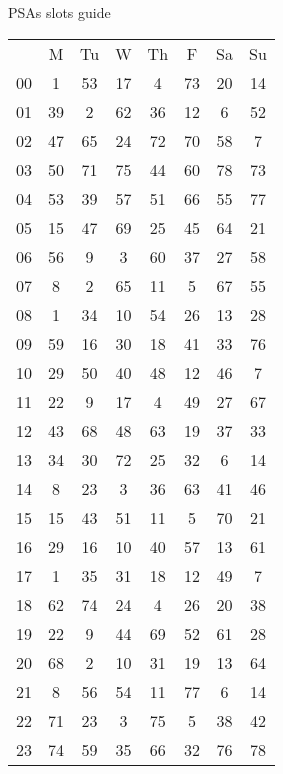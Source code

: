 \documentclass{article}
\begin{document}

\clearpage
\begin{center}
\Large PSAs slots guide
\end{center}

\begin{center}
\begin{tabular}{c|c|c|c|c|c|c|c|}
  \multicolumn{1}{c}{} & 
  \multicolumn{1}{c}{M} & 
  \multicolumn{1}{c}{Tu} & 
  \multicolumn{1}{c}{W} & 
  \multicolumn{1}{c}{Th} & 
  \multicolumn{1}{c}{F} & 
  \multicolumn{1}{c}{Sa} & 
  \multicolumn{1}{c}{Su} \\ \cline{2-8}
  00 & 1 & 53 & 17 & 4 & 73 & 20 & 14 \\ \cline{2-8}
  01 & 39 & 2 & 62 & 36 & 12 & 6 & 52 \\ \cline{2-8}
  02 & 47 & 65 & 24 & 72 & 70 & 58 & 7 \\ \cline{2-8}
  03 & 50 & 71 & 75 & 44 & 60 & 78 & 73 \\ \cline{2-8}
  04 & 53 & 39 & 57 & 51 & 66 & 55 & 77 \\ \cline{2-8}
  05 & 15 & 47 & 69 & 25 & 45 & 64 & 21 \\ \cline{2-8}
  06 & 56 & 9 & 3 & 60 & 37 & 27 & 58 \\ \cline{2-8}
  07 & 8 & 2 & 65 & 11 & 5 & 67 & 55 \\ \cline{2-8}
  08 & 1 & 34 & 10 & 54 & 26 & 13 & 28 \\ \cline{2-8}
  09 & 59 & 16 & 30 & 18 & 41 & 33 & 76 \\ \cline{2-8}
  10 & 29 & 50 & 40 & 48 & 12 & 46 & 7 \\ \cline{2-8}
  11 & 22 & 9 & 17 & 4 & 49 & 27 & 67 \\ \cline{2-8}
  12 & 43 & 68 & 48 & 63 & 19 & 37 & 33 \\ \cline{2-8}
  13 & 34 & 30 & 72 & 25 & 32 & 6 & 14 \\ \cline{2-8}
  14 & 8 & 23 & 3 & 36 & 63 & 41 & 46 \\ \cline{2-8}
  15 & 15 & 43 & 51 & 11 & 5 & 70 & 21 \\ \cline{2-8}
  16 & 29 & 16 & 10 & 40 & 57 & 13 & 61 \\ \cline{2-8}
  17 & 1 & 35 & 31 & 18 & 12 & 49 & 7 \\ \cline{2-8}
  18 & 62 & 74 & 24 & 4 & 26 & 20 & 38 \\ \cline{2-8}
  19 & 22 & 9 & 44 & 69 & 52 & 61 & 28 \\ \cline{2-8}
  20 & 68 & 2 & 10 & 31 & 19 & 13 & 64 \\ \cline{2-8}
  21 & 8 & 56 & 54 & 11 & 77 & 6 & 14 \\ \cline{2-8}
  22 & 71 & 23 & 3 & 75 & 5 & 38 & 42 \\ \cline{2-8}
  23 & 74 & 59 & 35 & 66 & 32 & 76 & 78 \\ \cline{2-8}
\end{tabular}
\end{center}
\end{document}
